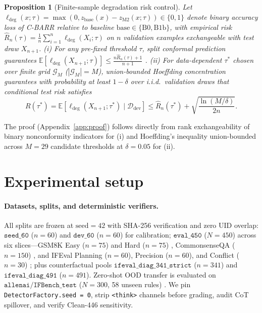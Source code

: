 \documentclass{article}
\newtheorem{proposition}{Proposition}
\begin{document}
\begin{proposition}[Finite-sample degradation risk control]
\label{prop:conformal}
Let $\ell_{\mathrm{deg}}(x; \tau) = \max(0, z_{\mathrm{base}}(x) - z_{\mathrm{M2}}(x; \tau)) \in \{0, 1\}$ denote binary accuracy loss of C-BARR relative to baseline $\mathrm{base} \in \{\mathrm{B0}, \mathrm{B1b}\}$, with empirical risk $\hat{R}_n(\tau) = \frac{1}{n}\sum_{i=1}^n \ell_{\mathrm{deg}}(X_i; \tau)$ on $n$ validation examples exchangeable with test draw $X_{n+1}$. (i) For any pre-fixed threshold $\tau$, split conformal prediction guarantees $\mathbb{E}[\ell_{\mathrm{deg}}(X_{n+1}; \tau)] \le \frac{n\hat{R}_n(\tau) + 1}{n + 1}$ \cite{wang2026conformal}. (ii) For data-dependent $\tau^*$ chosen over finite grid $\mathcal{G}_M$ ($|\mathcal{G}_M| = M$), union-bounded Hoeffding concentration guarantees with probability at least $1 - \delta$ over i.i.d.\ validation draws that conditional test risk satisfies
\begin{equation}
\label{eq:conformal}
R(\tau^*) = \mathbb{E}\!\left[\ell_{\mathrm{deg}}(X_{n+1}; \tau^*) \mid \mathcal{D}_{\mathrm{dev}}\right] \le \hat{R}_n(\tau^*) + \sqrt{\frac{\ln(M / \delta)}{2n}}.
\end{equation}
\end{proposition}
The proof (Appendix~\ref{app:proof}) follows directly from rank exchangeability of binary nonconformity indicators for (i) and Hoeffding's inequality union-bounded across $M=29$ candidate thresholds at $\delta=0.05$ for (ii).

\section{Experimental setup}
\label{sec:setup}

\paragraph{Datasets, splits, and deterministic verifiers.}
All splits are frozen at $\text{seed}=42$ with SHA-256 verification and zero UID overlap: $\texttt{seed\_60}$ ($n=60$) and $\texttt{dev\_60}$ ($n=60$) for calibration; $\texttt{eval\_450}$ ($N=450$) across six slices---GSM8K Easy ($n=75$) and Hard ($n=75$) \cite{cobbe2021gsm8k}, CommonsenseQA ($n=150$) \cite{talmor2019commonsenseqa}, and IFEval Planning ($n=60$), Precision ($n=60$), and Conflict ($n=30$) \cite{zhou2023ifeval}; plus counterfactual pools $\texttt{ifeval\_diag\_341\_strict}$ ($n=341$) and $\texttt{ifeval\_diag\_491}$ ($n=491$). Zero-shot OOD transfer is evaluated on $\texttt{allenai/IFBench\_test}$ ($N=300$, 58 unseen rules) \cite{pyatkin2025ifbench}. We pin \texttt{DetectorFactory.seed = 0}, strip \texttt{<think>} channels before grading, audit CoT spillover, and verify Clean-446 sensitivity.
\end{document}
